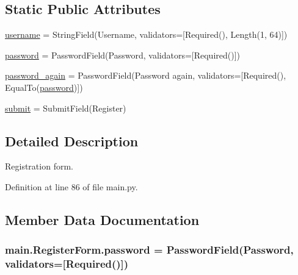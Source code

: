 \subsection*{Static Public Attributes}
\begin{DoxyCompactItemize}
\item 
\hyperlink{classmain_1_1RegisterForm_a358e684fade440a73243b01b69778fe9}{username} = String\+Field(\textquotesingle{}Username\textquotesingle{}, validators=\mbox{[}Required(), Length(1, 64)\mbox{]})
\item 
\hyperlink{classmain_1_1RegisterForm_a995a1a67b85b4165619b8cb0863940f0}{password} = Password\+Field(\textquotesingle{}Password\textquotesingle{}, validators=\mbox{[}Required()\mbox{]})
\item 
\hyperlink{classmain_1_1RegisterForm_a045a58303acc98394aedb828655268ab}{password\+\_\+again} = Password\+Field(\textquotesingle{}Password again\textquotesingle{}, validators=\mbox{[}Required(), Equal\+To(\textquotesingle{}\hyperlink{classmain_1_1RegisterForm_a995a1a67b85b4165619b8cb0863940f0}{password}\textquotesingle{})\mbox{]})
\item 
\hyperlink{classmain_1_1RegisterForm_a1d788d2aac9c4ac25887eb8b2072d170}{submit} = Submit\+Field(\textquotesingle{}Register\textquotesingle{})
\end{DoxyCompactItemize}


\subsection{Detailed Description}
\begin{DoxyVerb}Registration form.\end{DoxyVerb}
 

Definition at line 86 of file main.\+py.



\subsection{Member Data Documentation}
\subsubsection[{\texorpdfstring{password}{password}}]{\setlength{\rightskip}{0pt plus 5cm}main.\+Register\+Form.\+password = Password\+Field(\textquotesingle{}Password\textquotesingle{}, validators=\mbox{[}Required()\mbox{]})\hspace{0.3cm}{\ttfamily [static]}}\hypertarget{classmain_1_1RegisterForm_a995a1a67b85b4165619b8cb0863940f0}{}\label{classmain_1_1RegisterForm_a995a1a67b85b4165619b8cb0863940f0}


